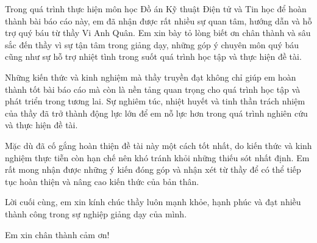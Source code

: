 \documentclass[
12pt,
oneside,
english,
doublespacing,
nolistspacing,
liststotoc,
parskip,
headsepline,
chapterinoneline,
]{HUSdissertation}
\author{NGUYỄN TIẾN DŨNG} 			%
\begin{document}
\lstset{style=codeC}	%

\frontmatter 			%

\pagestyle{plain} 


%









\begin{acknowledgements}
	\addchaptertocentry{\acknowledgementname}
	\thispagestyle{empty}

Trong quá trình thực hiện môn học Đồ án Kỹ thuật Điện tử và Tin học để hoàn thành bài báo cáo này, em đã nhận được rất nhiều sự quan tâm, hướng dẫn và hỗ trợ quý báu từ thầy Vi Anh Quân. Em xin bày tỏ lòng biết ơn chân thành và sâu sắc đến thầy vì sự tận tâm trong giảng dạy, những góp ý chuyên môn quý báu cũng như sự hỗ trợ nhiệt tình trong suốt quá trình học tập và thực hiện đề tài.

Những kiến thức và kinh nghiệm mà thầy truyền đạt không chỉ giúp em hoàn thành tốt bài báo cáo mà còn là nền tảng quan trọng cho quá trình học tập và phát triển trong tương lai. Sự nghiêm túc, nhiệt huyết và tinh thần trách nhiệm của thầy đã trở thành động lực lớn để em nỗ lực hơn trong quá trình nghiên cứu và thực hiện đề tài.

Mặc dù đã cố gắng hoàn thiện đề tài này một cách tốt nhất, do kiến thức và kinh nghiệm thực tiễn còn hạn chế nên khó tránh khỏi những thiếu sót nhất định. Em rất mong nhận được những ý kiến đóng góp và nhận xét từ thầy để có thể tiếp tục hoàn thiện và nâng cao kiến thức của bản thân.

Lời cuối cùng, em xin kính chúc thầy luôn mạnh khỏe, hạnh phúc và đạt nhiều thành công trong sự nghiệp giảng dạy của mình.

Em xin chân thành cảm ơn!
\end{acknowledgements}
\end{document}

